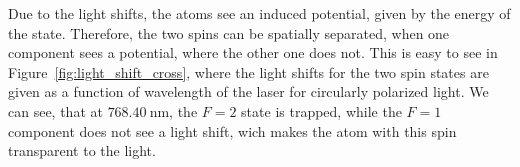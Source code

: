 \begin{figure}[t]%
%
\end{figure}%

Due to the light shifts, the atoms see an induced potential, given by the energy of the state. Therefore, the two spins can be spatially separated, when one component sees a potential, where the other one does not. This is easy to see in Figure~\ref{fig:light_shift_cross}, where the light shifts for the two spin states are given as a function of wavelength of the laser for circularly polarized light. We can see, that at $\SI{768.40}{\nano\meter}$, the $F=2$ state is trapped, while the $F=1$ component does not see a light shift, wich makes the atom with this spin transparent to the light.

\begin{figure}[t]%
%
\end{figure}%

